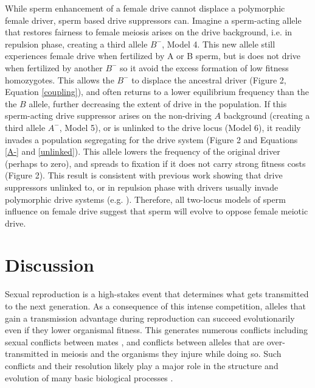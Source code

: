 \documentclass{pnastwo}
\begin{document}
\begin{article}
While  sperm enhancement of a female drive cannot displace a polymorphic female driver, sperm based drive suppressors can. 
Imagine a sperm-acting allele that restores fairness to female meiosis arises on
	the drive background, i.e. in repulsion phase, creating a
        third allele $B^{-}$, Model 4. This new allele still
        experiences female drive when fertilized by A or B sperm, but 
       is does not drive when fertilized by another $B^{-}$ so it
       avoid the excess formation of low fitness homozygotes. This
     allows the $B^{-}$ to displace the ancestral driver (Figure
     2, Equation \ref{coupling}), 
	and often returns to a lower equilibrium frequency than the the $B$ allele, further decreasing the extent of drive in the population.  
If this sperm-acting drive suppressor arises on 
	the non-driving $A$ background (creating a third allele $A^{-}$, Model 5), 
	or is unlinked to the drive locus (Model 6), it readily invades a population segregating
	for the drive system (Figure 2 and Equations \ref{A-} and \ref{unlinked}).  
This allele lowers the frequency of the original driver (perhaps to zero),
	and spreads to fixation if it does not carry strong fitness costs
	(Figure 2). 
This result is consistent with previous work showing that drive suppressors unlinked to, or in repulsion phase with drivers usually invade polymorphic drive systems (e.g. \cite{Brandvain2012}).  
Therefore, all two-locus models of sperm influence on female drive suggest that
	sperm will evolve to oppose female meiotic drive.	
	


\section*{Discussion}

Sexual reproduction is a high-stakes event that determines what gets transmitted to the next generation.  
As a consequence of this intense competition, alleles that gain a transmission advantage during reproduction 
	can succeed evolutionarily even if they lower organismal fitness. 
This generates numerous conflicts  \cite{Burt2006} including sexual conflicts between mates \cite{Arnqvist2005}, 
	and conflicts between alleles that are over-transmitted in meiosis and the organisms they injure while doing so. 
Such conflicts and their resolution likely play a major role in the structure and evolution of many basic biological processes \cite{Rice2013}.


\end{article}
\end{document}
